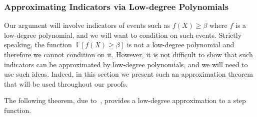 \documentclass[11pt]{article}
\DeclareMathOperator*{\Ind}{\mathbb{I}}
\def \sos {SoS\xspace}
\newtheorem{theorem}{Theorem}[section]
\theoremstyle{definition}
\begin{document}
\subsubsection{Approximating Indicators via Low-degree Polynomials}\label{sec:apx-ind}



Our argument will involve indicators of events such as 
$f(X)\geq \beta$ where $f$ is a low-degree polynomial, and we will want to condition on such events. Strictly speaking, the function $\Ind[f(X)\geq \beta]$ is not a low-degree polynomial and therefore we cannot condition on it. However, it is not difficult to show that such indicators can be approximated by low-degree polynomials, and we will need to use such ideas. 
Indeed, in this section we present such an approximation theorem that will be used throughout our proofs.

The following theorem, due to~\cite{diakonikolas2010bounded}, provides a low-degree approximation to a step function.
\end{document}
